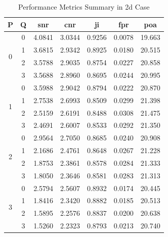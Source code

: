 \begin{table}[htbp!]
\centering
\caption{Performance Metrics Summary in \gls{2d} Case}
\begin{tabular}{ccccccc}
\hline
\textbf{P} & \textbf{Q} & \textbf{\gls{snr}} & \textbf{\gls{cnr}} & \gls{ji} & \gls{fpr} & \gls{poa} \\ \hline
\multirow{4}{*}{0} & 0 & 4.0841 & 3.0344 & 0.9256 & 0.0078 & 19.663 \\
 & 1 & 3.6815 & 2.9342 & 0.8925 & 0.0180 & 20.515 \\
 & 2 & 3.5788 & 2.9035 & 0.8754 & 0.0227 & 20.858 \\
 & 3 & 3.5688 & 2.8960 & 0.8695 & 0.0244 & 20.995 \\ \hline
\multirow{4}{*}{1} & 0 & 3.5988 & 2.9042 & 0.8794 & 0.0222 & 20.870 \\
 & 1 & 2.7538 & 2.6993 & 0.8509 & 0.0299 & 21.398 \\
 & 2 & 2.5159 & 2.6191 & 0.8488 & 0.0308 & 21.475 \\
 & 3 & 2.4691 & 2.6007 & 0.8533 & 0.0292 & 21.350 \\ \hline
\multirow{4}{*}{2} & 0 & 2.9564 & 2.7050 & 0.8685 & 0.0240 & 20.908 \\
 & 1 & 2.1686 & 2.4761 & 0.8648 & 0.0267 & 21.228 \\
 & 2 & 1.8753 & 2.3861 & 0.8578 & 0.0284 & 21.333 \\
 & 3 & 1.8050 & 2.3646 & 0.8581 & 0.0283 & 21.313 \\ \hline
\multirow{4}{*}{3} & 0 & 2.5794 & 2.5607 & 0.8932 & 0.0174 & 20.445 \\
 & 1 & 1.8416 & 2.3420 & 0.8882 & 0.0185 & 20.513 \\
 & 2 & 1.5895 & 2.2576 & 0.8837 & 0.0200 & 20.638 \\
 & 3 & 1.5260 & 2.2323 & 0.8793 & 0.0213 & 20.740 \\ \hline
\end{tabular}
\label{tab:perfSum2D}
\end{table}


